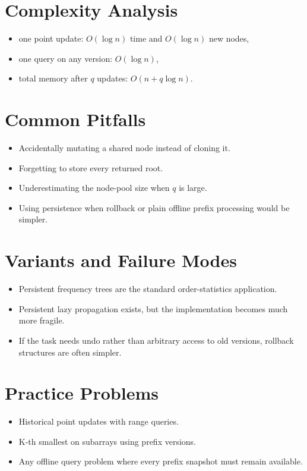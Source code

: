 \section*{Complexity Analysis}

\begin{itemize}
  \item one point update: \(O(\log n)\) time and \(O(\log n)\) new nodes,
  \item one query on any version: \(O(\log n)\),
  \item total memory after \(q\) updates: \(O(n + q \log n)\).
\end{itemize}

\section*{Common Pitfalls}

\begin{itemize}
  \item Accidentally mutating a shared node instead of cloning it.
  \item Forgetting to store every returned root.
  \item Underestimating the node-pool size when \(q\) is large.
  \item Using persistence when rollback or plain offline prefix processing would be simpler.
\end{itemize}

\section*{Variants and Failure Modes}

\begin{itemize}
  \item Persistent frequency trees are the standard order-statistics application.
  \item Persistent lazy propagation exists, but the implementation becomes much more fragile.
  \item If the task needs undo rather than arbitrary access to old versions, rollback structures are often simpler.
\end{itemize}

\section*{Practice Problems}

\begin{itemize}
  \item Historical point updates with range queries.
  \item K-th smallest on subarrays using prefix versions.
  \item Any offline query problem where every prefix snapshot must remain available.
\end{itemize}

